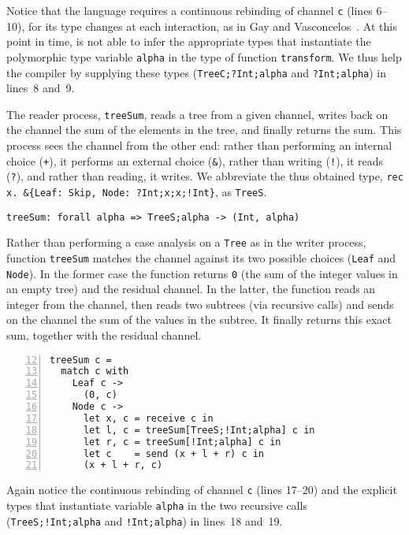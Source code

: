 Notice that the language requires a continuous rebinding of channel
\lstinline|c| (lines 6--10), for its type changes at each interaction,
as in Gay and Vasconcelos~\cite{DBLP:journals/jfp/GayV10}.
%
At this point in time, \freest{} is not able to infer the appropriate
types that instantiate the polymorphic type variable \lstinline|alpha|
in the type of function \lstinline|transform|. We thus help the
compiler by supplying these types (\lstinline|TreeC;?Int;alpha| and
\lstinline|?Int;alpha|) in lines~8 and~9.

The reader process, \lstinline|treeSum|, reads a tree from a given
channel, writes back on the channel the sum of the elements in the
tree, and finally returns the sum. This process sees the channel from
the other end: rather than performing an internal choice
(\lstinline|+|), it performs an external choice (\lstinline|&|),
rather than writing (\lstinline|!|), it reads (\lstinline|?|), and
rather than reading, it writes. We abbreviate the thus obtained type,
\lstinline|rec x. &{Leaf: Skip, Node: ?Int;x;x;!Int}|, as
\lstinline|TreeS|.
%
\begin{lstlisting}
treeSum: forall alpha => TreeS;alpha -> (Int, alpha)
\end{lstlisting}

Rather than performing a case analysis on a \lstinline|Tree| as in the
writer process, function \lstinline|treeSum| matches the channel
against its two possible choices (\lstinline|Leaf| and
\lstinline|Node|). In the former case the function returns
\lstinline|0| (the sum of the integer values in an empty tree) and the
residual channel. In the latter, the function reads an integer from
the channel, then reads two subtrees (via recursive calls) and sends
on the channel the sum of the values in the subtree. It finally
returns this exact sum, together with the residual channel.
%
\label{lst:treeSum}
\begin{lstlisting}[numbers=left,firstnumber=12]
treeSum c =
  match c with
    Leaf c ->
      (0, c)
    Node c ->
      let x, c = receive c in
      let l, c = treeSum[TreeS;!Int;alpha] c in
      let r, c = treeSum[!Int;alpha] c in
      let c    = send (x + l + r) c in
      (x + l + r, c)
\end{lstlisting}

Again notice the continuous rebinding of channel \lstinline|c| (lines
17--20) and the explicit types that instantiate variable
\lstinline|alpha| in the two recursive calls
(\lstinline|TreeS;!Int;alpha| and \lstinline|!Int;alpha|) in lines~18
and~19.

